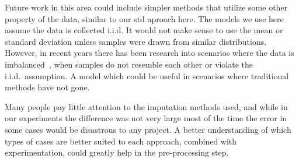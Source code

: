 \documentclass[12pt]{article}
\begin{document}
Future work in this area could include simpler methods that utilize
some other property of the data, similar to our std aproach here.
The models we use here assume the data is collected i.i.d.
It would not make sense to use the mean or standard deviation
unless samples were drawn from similar distributions.
However, in recent years there has been research into scenarios where
the data is imbalanced~\cite{he2009learning}, when samples do not resemble each other or 
violate the i.i.d.\ assumption.
A model which could be useful in scenarios where traditional methods
have not gone.

Many people pay little attention to the imputation methods used,
and while in our experiments the difference was not very large most of the time
the error in some cases would be disastrous to any project.
A better understanding of which types of cases are better suited to each 
approach, combined with experimentation, could greatly help in 
the pre-processing step.
\printbibliography
\end{document}
